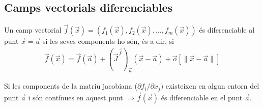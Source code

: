 \subsection{Camps vectorials diferenciables}
Un camp vectorial $\vec{f}(\vec{x}) = (f_{1}(\vec{x}), f_{2}(\vec{x}), \dots, f_{m}(\vec{x}))$ és diferenciable al punt $\vec{x} = \vec{a}$ si les seves components ho són, és a dir, si 
\begin{align}
    \vec{f}(\vec{x}) = \vec{f}(\vec{a}) + (\vec{J}^{\vec{f}})_{\vec{a}} (\vec{x} - \vec{a}) + \vec{o}[\| \vec{x} - \vec{a} \|]
\end{align}

\begin{thm}
    Si les components de la matriu jacobiana ($\partial f_{i} / \partial x_{j})$ existeixen en algun entorn del punt $\vec{a}$ i són contínues en aquest punt $\Rightarrow \vec{f}(\vec{x})$ és diferenciable en el punt $\vec{a}$.
\end{thm}

